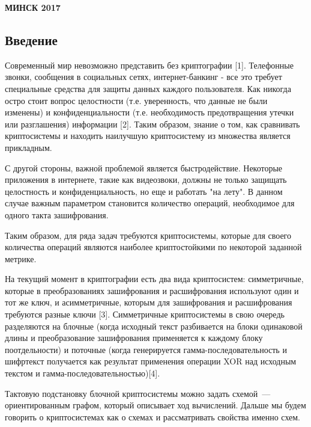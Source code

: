 \documentclass[a4paper,12pt]{extarticle}
\begin{document}

\begin{center}
\bf{МИНСК 2017}
\end{center}
\begin{large}
\newpage
\tableofcontents
 
\clearpage

\newpage
\section*{Введение}
\vspace*{1cm}

Современный мир невозможно представить без криптографии [1]. Телефонные звонки, сообщения в социальных сетях, интернет-банкинг - все это требует специальные средства для защиты данных каждого пользователя. Как никогда остро стоит вопрос целостности (т.е. уверенность, что данные не были изменены) и конфиденциальности (т.е. необходимость предотвращения утечки или разглашения) информации [2]. Таким образом, знание о том, как сравнивать криптосистемы и находить наилучшую криптосистему из множества является прикладным.

С другой стороны, важной проблемой является быстродействие. Некоторые приложения в интернете, такие как видеозвоки, должны не только защищать целостность и конфиденциальность, но еще и работать "на лету". В данном случае важным параметром становится количество операций, необходимое для одного такта зашифрования.

Таким образом, для ряда задач требуются криптосистемы, которые для своего количества операций являются наиболее криптостойкими по некоторой заданной метрике.

На текущий момент в криптографии есть два вида криптосистем: симметричные, которые в преобразованиях зашифрования и расшифрования используют один и тот же ключ, и асимметричные, которым для зашифрования и расшифрования требуются разные ключи [3]. Симметричные криптосистемы в свою очередь разделяются на блочные (когда исходный текст разбивается на блоки одинаковой длины и преобразование зашифрования применяется к каждому блоку поотдельности) и поточные (когда генерируется гамма-последовательность и шифртекст получается как результат применения операции XOR над исходным текстом и гамма-последовательностью)[4]. 

Тактовую подстановку блочной криптосистемы можно задать схемой~---
ориентированным графом, который описывает ход вычислений. Дальше мы будем говорить о криптосистемах как о схемах и рассматривать свойства именно схем.


\end{large}
\end{document}

